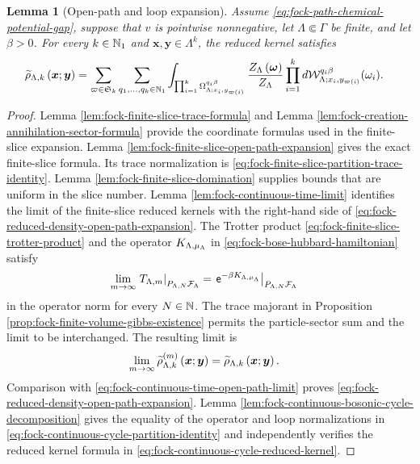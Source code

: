 \documentclass[11pt,a4paper]{article}
\theoremstyle{plain}
\newtheorem{lem}[thm]{Lemma}
\theoremstyle{definition}
\theoremstyle{remark}
\begin{document}
\begin{lem}[Open-path and loop expansion]\label{lem:fock-loop-marked-chain-expansion}
Assume \eqref{eq:fock-path-chemical-potential-gap}, suppose that $v$ is pointwise nonnegative, let
$\Lambda\Subset\Gamma$ be finite, and let $\beta>0$.
For every $k\in\mathbb{N}_1$ and $\boldsymbol{x},\boldsymbol{y}\in\Lambda^k$, the reduced kernel satisfies
\begin{equation}
\begin{aligned}
\fun{\widetilde{\rho}_{\Lambda,k}}{\boldsymbol{x};\boldsymbol{y}}
& =
\sum_{\varpi \in \grsym{k}}
\sum_{q_1,\ldots,q_k \in \semigrposint}
\int_{\prod_{i = 1}^{k}\Omega_{\Lambda;x_i,y_{\fun{\varpi}{i}}}^{q_i\beta}}
\frac{\fun{Z_{\Lambda}}{\boldsymbol{\omega}}}{Z_{\Lambda}}
\prod_{i = 1}^{k}
\opdmsr{\msrcal{W}_{\Lambda;x_i,y_{\fun{\varpi}{i}}}^{q_i\beta}}(\omega_i).
\end{aligned}
\label{eq:fock-reduced-density-open-path-expansion}
\end{equation}
\end{lem}

\begin{proof}
Lemma \ref{lem:fock-finite-slice-trace-formula} and
Lemma \ref{lem:fock-creation-annihilation-sector-formula} provide the coordinate formulas used in the
finite-slice expansion.
Lemma \ref{lem:fock-finite-slice-open-path-expansion} gives the exact finite-slice formula.
Its trace normalization is \eqref{eq:fock-finite-slice-partition-trace-identity}.
Lemma \ref{lem:fock-finite-slice-domination} supplies bounds that are uniform in the slice number.
Lemma \ref{lem:fock-continuous-time-limit} identifies the limit of the finite-slice reduced kernels with the
right-hand side of \eqref{eq:fock-reduced-density-open-path-expansion}.
The Trotter product \eqref{eq:fock-finite-slice-trotter-product} and the operator
$K_{\Lambda,\smchemicalpotential_{\Lambda}}$ in \eqref{eq:fock-bose-hubbard-hamiltonian} satisfy
$$\begin{aligned}
\lim_{m\to\infty}
\fnrestr{T_{\Lambda,m}}{P_{\Lambda,N}\sphilb{F}_{\Lambda}}
& =
\fnrestr{
\napiernum^{-\beta K_{\Lambda,\smchemicalpotential_{\Lambda}}}
}{P_{\Lambda,N}\sphilb{F}_{\Lambda}}
\end{aligned}$$
in the operator norm for every $N\in\mathbb{N}$.
The trace majorant in Proposition \ref{prop:fock-finite-volume-gibbs-existence} permits the particle-sector sum
and the limit to be interchanged.
The resulting limit is
$$\begin{aligned}
\lim_{m\to\infty}
\widetilde{\rho}_{\Lambda,k}^{(m)} \left( \boldsymbol{x};\boldsymbol{y} \right)
& =
\widetilde{\rho}_{\Lambda,k} \left( \boldsymbol{x};\boldsymbol{y} \right).
\end{aligned}$$
Comparison with \eqref{eq:fock-continuous-time-open-path-limit} proves
\eqref{eq:fock-reduced-density-open-path-expansion}.
Lemma \ref{lem:fock-continuous-bosonic-cycle-decomposition} gives the equality of the operator and loop
normalizations in \eqref{eq:fock-continuous-cycle-partition-identity} and independently verifies the reduced
kernel formula in \eqref{eq:fock-continuous-cycle-reduced-kernel}.
\end{proof}
\end{document}
